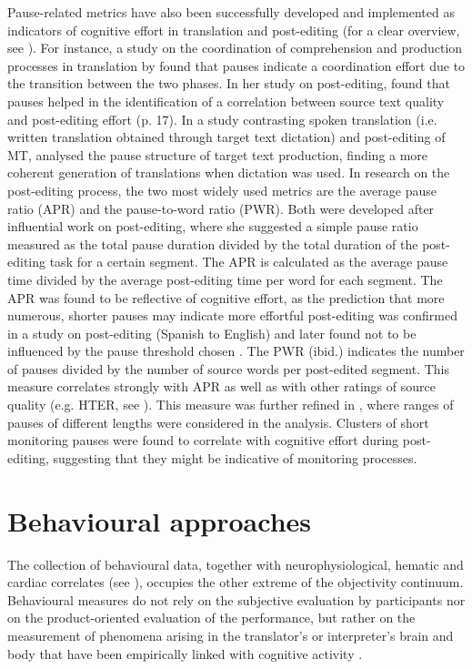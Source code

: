 \begin{sloppypar}
Pause-related metrics have also been successfully developed and implemented as indicators of cognitive effort in translation and post-editing (for a clear overview, see \citealt{lacruz_pause_2016}). For instance, a study on the coordination of comprehension and production processes in translation by \citet{dragsted_comprehension_2008} found that pauses indicate a coordination effort due to the transition between the two phases. In her study on post-editing, \citet{obrien_pauses_2006} found that pauses helped in the identification of a correlation between source text quality and post-editing effort (p. 17). In a study contrasting spoken translation (i.e. written translation obtained through target text dictation) and post-editing of MT, \citet{carl_comparing_2016} analysed the pause structure of target text production, finding a more coherent generation of translations when dictation was used. In research on the post-editing process, the two most widely used metrics are the average pause ratio (APR) and the pause-to-word ratio (PWR). Both were developed after  influential work on post-editing, where she suggested a simple pause ratio measured as the total pause duration divided by the total duration of the post-editing task for a certain segment. The APR \citep{lacruz_post-editing_2014} is calculated as the average pause time divided by the average post-editing time per word for each segment. The APR was found to be reflective of cognitive effort, as the prediction that more numerous, shorter pauses may indicate more effortful post-editing was confirmed in a study on post-editing (Spanish to English) and later found not to be influenced by the pause threshold chosen \citep{lacruz-etal-2014-cognitive}. The PWR (ibid.) indicates the number of pauses divided by the number of source words per post-edited segment. This measure correlates strongly with APR as well as with other ratings of source quality (e.g. HTER, see \citealt{snover-etal-2006-study}). This measure was further refined in \citet{lacruz_literality_2018}, where ranges of pauses of different lengths were considered in the analysis. Clusters of short monitoring pauses were found to correlate with cognitive effort during post-editing, suggesting that they might be indicative of monitoring processes.
\end{sloppypar}

\section{Behavioural approaches} \label{behavioural_measures}
The collection of behavioural data, together with neurophysiological, hematic and cardiac correlates (see ), occupies the other extreme of the objectivity continuum. Behavioural measures do not rely on the subjective evaluation by participants nor on the product-oriented evaluation of the performance, but rather on the measurement of phenomena arising in the translator's or interpreter's brain and body that have been empirically linked with cognitive activity \citep[22]{jakobsen_TPR_2017}.

